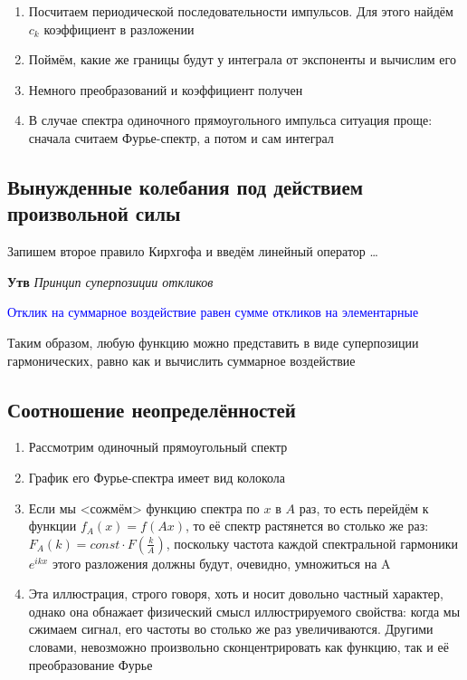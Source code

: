 \documentclass[a4paper, 14pt]{article}
\begin{document}
    \begin{enumerate}
        \item Посчитаем периодической последовательности импульсов.
        Для этого найдём $c_k$ коэффициент в разложении
        \item Поймём, какие же границы будут у интеграла от экспоненты и вычислим его
        \item Немного преобразований и коэффициент получен
        \item В случае спектра одиночного прямоугольного импульса ситуация проще: сначала считаем Фурье-спектр, а
        потом и сам интеграл
    \end{enumerate}
    
    \subsection{Вынужденные колебания под действием произвольной силы}
    
    Запишем второе правило Кирхгофа и введём линейный оператор \ldots
    
    \textbf{Утв} \textit{Принцип суперпозиции откликов}
    
    \textcolor{blue}{Отклик на суммарное воздействие равен сумме откликов на элементарные}
    
    Таким образом, любую функцию можно представить в виде суперпозиции гармонических, равно как и вычислить суммарное
    воздействие
    
    \subsection{Соотношение неопределённостей}
    
    \begin{enumerate}
        \item Рассмотрим одиночный прямоугольный спектр
        \item График его Фурье-спектра имеет вид колокола
        \item Если мы <сожмём> функцию спектра по $x$ в $A$ раз, то есть перейдём к функции $f_A(x) = f(Ax)$, то её
        спектр растянется во столько же раз: $F_A(k) = const \cdot F\left(\frac{k}{A}\right)$, поскольку частота каждой
        спектральной
        гармоники $e^{ikx}$ этого разложения должны будут, очевидно, умножиться на A
        \item Эта иллюстрация, строго говоря, хоть и носит довольно частный характер, однако она обнажает
        физический смысл иллюстрируемого свойства: когда мы сжимаем сигнал, его частоты во столько же раз увеличиваются.
        Другими словами, невозможно произвольно сконцентрировать как функцию, так и её преобразование Фурье
    \end{enumerate}
    
\end{document}
